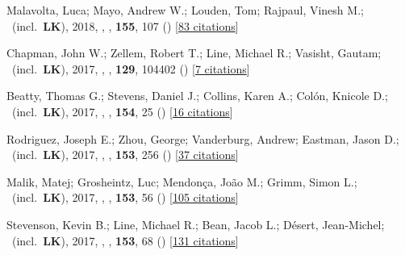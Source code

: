 \item[{\color{numcolor}\scriptsize17}] Malavolta, Luca; Mayo, Andrew W.; Louden, Tom; Rajpaul, Vinesh M.; \etal\ (incl.\ \textbf{LK}), 2018, , \aj, \textbf{155}, 107 () [\href{https://ui.adsabs.harvard.edu/abs/2018AJ....155..107M}{83 citations}]

\item[{\color{numcolor}\scriptsize16}] Chapman, John W.; Zellem, Robert T.; Line, Michael R.; Vasisht, Gautam; \etal\ (incl.\ \textbf{LK}), 2017, , \pasp, \textbf{129}, 104402 () [\href{https://ui.adsabs.harvard.edu/abs/2017PASP..129j4402C}{7 citations}]

\item[{\color{numcolor}\scriptsize15}] Beatty, Thomas G.; Stevens, Daniel J.; Collins, Karen A.; Col{\'o}n, Knicole D.; \etal\ (incl.\ \textbf{LK}), 2017, , \aj, \textbf{154}, 25 () [\href{https://ui.adsabs.harvard.edu/abs/2017AJ....154...25B}{16 citations}]

\item[{\color{numcolor}\scriptsize14}] Rodriguez, Joseph E.; Zhou, George; Vanderburg, Andrew; Eastman, Jason D.; \etal\ (incl.\ \textbf{LK}), 2017, , \aj, \textbf{153}, 256 () [\href{https://ui.adsabs.harvard.edu/abs/2017AJ....153..256R}{37 citations}]

\item[{\color{numcolor}\scriptsize13}] Malik, Matej; Grosheintz, Luc; Mendon{\c{c}}a, Jo{\~a}o M.; Grimm, Simon L.; \etal\ (incl.\ \textbf{LK}), 2017, , \aj, \textbf{153}, 56 () [\href{https://ui.adsabs.harvard.edu/abs/2017AJ....153...56M}{105 citations}]

\item[{\color{numcolor}\scriptsize12}] Stevenson, Kevin B.; Line, Michael R.; Bean, Jacob L.; D{\'e}sert, Jean-Michel; \etal\ (incl.\ \textbf{LK}), 2017, , \aj, \textbf{153}, 68 () [\href{https://ui.adsabs.harvard.edu/abs/2017AJ....153...68S}{131 citations}]

